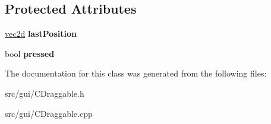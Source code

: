\subsection*{Protected Attributes}
\begin{DoxyCompactItemize}
\item 
\hypertarget{class_c_draggable_a3caac7d16cd002330368b43439e22e6c}{
\hyperlink{classvec2d}{vec2d} {\bfseries lastPosition}}
\label{class_c_draggable_a3caac7d16cd002330368b43439e22e6c}

\item 
\hypertarget{class_c_draggable_ab48356d215bf3572f87465a7205f048e}{
bool {\bfseries pressed}}
\label{class_c_draggable_ab48356d215bf3572f87465a7205f048e}

\end{DoxyCompactItemize}


The documentation for this class was generated from the following files:\begin{DoxyCompactItemize}
\item 
src/gui/CDraggable.h\item 
src/gui/CDraggable.cpp\end{DoxyCompactItemize}
